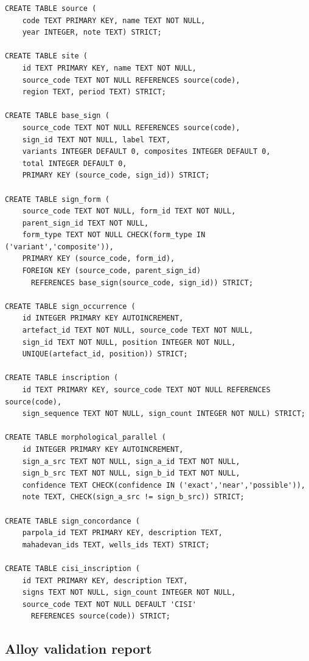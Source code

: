 {\small
\begin{verbatim}
CREATE TABLE source (
    code TEXT PRIMARY KEY, name TEXT NOT NULL,
    year INTEGER, note TEXT) STRICT;

CREATE TABLE site (
    id TEXT PRIMARY KEY, name TEXT NOT NULL,
    source_code TEXT NOT NULL REFERENCES source(code),
    region TEXT, period TEXT) STRICT;

CREATE TABLE base_sign (
    source_code TEXT NOT NULL REFERENCES source(code),
    sign_id TEXT NOT NULL, label TEXT,
    variants INTEGER DEFAULT 0, composites INTEGER DEFAULT 0,
    total INTEGER DEFAULT 0,
    PRIMARY KEY (source_code, sign_id)) STRICT;

CREATE TABLE sign_form (
    source_code TEXT NOT NULL, form_id TEXT NOT NULL,
    parent_sign_id TEXT NOT NULL,
    form_type TEXT NOT NULL CHECK(form_type IN ('variant','composite')),
    PRIMARY KEY (source_code, form_id),
    FOREIGN KEY (source_code, parent_sign_id)
      REFERENCES base_sign(source_code, sign_id)) STRICT;

CREATE TABLE sign_occurrence (
    id INTEGER PRIMARY KEY AUTOINCREMENT,
    artefact_id TEXT NOT NULL, source_code TEXT NOT NULL,
    sign_id TEXT NOT NULL, position INTEGER NOT NULL,
    UNIQUE(artefact_id, position)) STRICT;

CREATE TABLE inscription (
    id TEXT PRIMARY KEY, source_code TEXT NOT NULL REFERENCES source(code),
    sign_sequence TEXT NOT NULL, sign_count INTEGER NOT NULL) STRICT;

CREATE TABLE morphological_parallel (
    id INTEGER PRIMARY KEY AUTOINCREMENT,
    sign_a_src TEXT NOT NULL, sign_a_id TEXT NOT NULL,
    sign_b_src TEXT NOT NULL, sign_b_id TEXT NOT NULL,
    confidence TEXT CHECK(confidence IN ('exact','near','possible')),
    note TEXT, CHECK(sign_a_src != sign_b_src)) STRICT;

CREATE TABLE sign_concordance (
    parpola_id TEXT PRIMARY KEY, description TEXT,
    mahadevan_ids TEXT, wells_ids TEXT) STRICT;

CREATE TABLE cisi_inscription (
    id TEXT PRIMARY KEY, description TEXT,
    signs TEXT NOT NULL, sign_count INTEGER NOT NULL,
    source_code TEXT NOT NULL DEFAULT 'CISI'
      REFERENCES source(code)) STRICT;
\end{verbatim}
}

\subsection{Alloy validation report}

